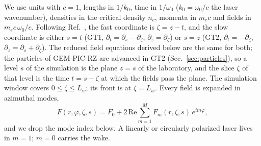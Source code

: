 \documentclass[aps,prab,reprint,floatfix,superscriptaddress,amsmath,amssymb]{revtex4-2}
\begin{document}
We use units with $c = 1$, lengths in $1/k_0$, time in $1/\omega_0$ ($k_0 = \omega_0/c$ the laser wavenumber), densities in the critical density $n_c$, momenta in $m_e c$ and fields in $m_e c\,\omega_0/e$. Following Ref.~\cite{GEMPIC}, the fast coordinate is $\zeta = z - t$, and the slow coordinate is either $s = t$ (GT1, $\partial_t = \partial_s - \partial_\zeta$, $\partial_z = \partial_\zeta$) or $s = z$ (GT2, $\partial_t = -\partial_\zeta$, $\partial_z = \partial_s + \partial_\zeta$). The reduced field equations derived below are the same for both; the particles of GEM-PIC-RZ are advanced in GT2 (Sec.~\ref{sec:particles}), so a level $s$ of the simulation is the plane $z = s$ of the laboratory, and the slice $\zeta$ of that level is the time $t = s - \zeta$ at which the fields pass the plane. The simulation window covers $0 \le \zeta \le L_w$; its front is at $\zeta = L_w$. Every field is expanded in azimuthal modes,
\begin{equation}
F(r,\varphi,\zeta,s) = F_0 + 2\,\mathrm{Re}\sum_{m=1}^{M} F_m(r,\zeta,s)\, e^{im\varphi},
\end{equation}
and we drop the mode index below. A linearly or circularly polarized laser lives in $m = 1$; $m = 0$ carries the wake.
\end{document}
